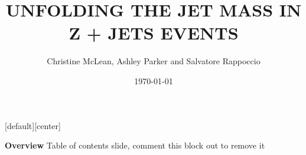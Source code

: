 \documentclass{beamer}
\title[JET MASS  IN Z + JETS]{\textbf{UNFOLDING THE JET MASS  IN Z + JETS EVENTS }} %
\author{Christine McLean, Ashley Parker and Salvatore Rappoccio} %
\institute[University at Buffalo] %
{
\textcolor{white}{\textit{ash.marie.parker@gmail.com}} %
}
\date{\today} %
\begin{document}
{

\begin{frame}[plain]
    \titlepage
\end{frame}
  }

[default][center]%

\begin{frame}{\textbf{Overview}}
\vspace{3.5mm}
Table of contents slide, comment this block out to remove it
\tableofcontents %
\end{frame}
\end{document}
